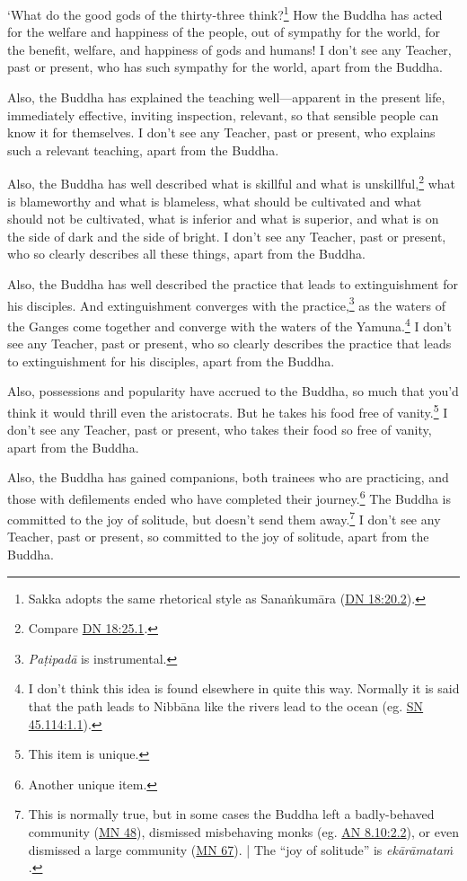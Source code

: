 \documentclass[12pt,openany]{book}%
\begin{document}
‘What do the good gods of the thirty-three think?\footnote{Sakka adopts the same rhetorical style as \textsanskrit{Sanaṅkumāra} (\href{https://suttacentral.net/dn18/en/sujato\#20.2}{DN 18:20.2}). } How the Buddha has acted for the welfare and happiness of the people, out of sympathy for the world, for the benefit, welfare, and happiness of gods and humans! I don’t see any Teacher, past or present, who has such sympathy for the world, apart from the Buddha. 

Also, the Buddha has explained the teaching well—apparent in the present life, immediately effective, inviting inspection, relevant, so that sensible people can know it for themselves. I don’t see any Teacher, past or present, who explains such a relevant teaching, apart from the Buddha. 

Also, the Buddha has well described what is skillful and what is unskillful,\footnote{Compare \href{https://suttacentral.net/dn18/en/sujato\#25.1}{DN 18:25.1}. } what is blameworthy and what is blameless, what should be cultivated and what should not be cultivated, what is inferior and what is superior, and what is on the side of dark and the side of bright. I don’t see any Teacher, past or present, who so clearly describes all these things, apart from the Buddha. 

Also, the Buddha has well described the practice that leads to extinguishment for his disciples. And extinguishment converges with the practice,\footnote{\textit{\textsanskrit{Paṭipadā}} is instrumental. } as the waters of the Ganges come together and converge with the waters of the Yamuna.\footnote{I don’t think this idea is found elsewhere in quite this way. Normally it is said that the path leads to \textsanskrit{Nibbāna} like the rivers lead to the ocean (eg. \href{https://suttacentral.net/sn45.114/en/sujato\#1.1}{SN 45.114:1.1}). } I don’t see any Teacher, past or present, who so clearly describes the practice that leads to extinguishment for his disciples, apart from the Buddha. 

Also, possessions and popularity have accrued to the Buddha, so much that you’d think it would thrill even the aristocrats. But he takes his food free of vanity.\footnote{This item is unique. } I don’t see any Teacher, past or present, who takes their food so free of vanity, apart from the Buddha. 

Also, the Buddha has gained companions, both trainees who are practicing, and those with defilements ended who have completed their journey.\footnote{Another unique item. } The Buddha is committed to the joy of solitude, but doesn’t send them away.\footnote{This is normally true, but in some cases the Buddha left a badly-behaved community (\href{https://suttacentral.net/mn48/en/sujato}{MN 48}), dismissed misbehaving monks (eg. \href{https://suttacentral.net/an8.10/en/sujato\#2.2}{AN 8.10:2.2}), or even dismissed a large community (\href{https://suttacentral.net/mn67/en/sujato}{MN 67}). | The “joy of solitude” is \textit{\textsanskrit{ekārāmataṁ} }. } I don’t see any Teacher, past or present, so committed to the joy of solitude, apart from the Buddha. 
\end{document}
